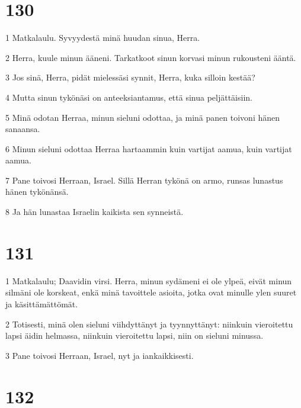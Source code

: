 \chapter{130}

\par 1 Matkalaulu. Syvyydestä minä huudan sinua, Herra.
\par 2 Herra, kuule minun ääneni. Tarkatkoot sinun korvasi minun rukousteni ääntä.
\par 3 Jos sinä, Herra, pidät mielessäsi synnit, Herra, kuka silloin kestää?
\par 4 Mutta sinun tykönäsi on anteeksiantamus, että sinua peljättäisiin.
\par 5 Minä odotan Herraa, minun sieluni odottaa, ja minä panen toivoni hänen sanaansa.
\par 6 Minun sieluni odottaa Herraa hartaammin kuin vartijat aamua, kuin vartijat aamua.
\par 7 Pane toivosi Herraan, Israel. Sillä Herran tykönä on armo, runsas lunastus hänen tykönänsä.
\par 8 Ja hän lunastaa Israelin kaikista sen synneistä.

\chapter{131}

\par 1 Matkalaulu; Daavidin virsi. Herra, minun sydämeni ei ole ylpeä, eivät minun silmäni ole korskeat, enkä minä tavoittele asioita, jotka ovat minulle ylen suuret ja käsittämättömät.
\par 2 Totisesti, minä olen sieluni viihdyttänyt ja tyynnyttänyt: niinkuin vieroitettu lapsi äidin helmassa, niinkuin vieroitettu lapsi, niin on sieluni minussa.
\par 3 Pane toivosi Herraan, Israel, nyt ja iankaikkisesti.

\chapter{132}

